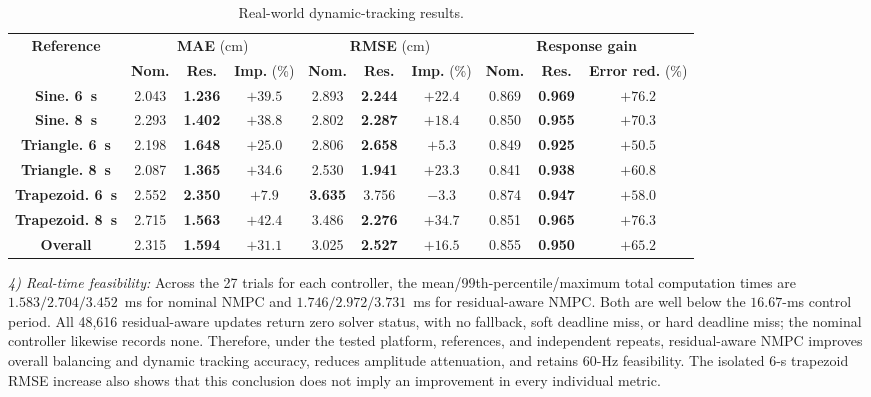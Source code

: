 \documentclass[letterpaper, 10 pt, conference]{ieeeconf}  %
\begin{document}
\begin{table}[t]
    \caption{Real-world dynamic-tracking results.}
    \label{tab:real_world_dynamic_tracking}
    \centering
    {\renewcommand{\arraystretch}{1.2}
    \begin{tabular}{|c|ccc|ccc|ccc|}
        \hline
        \multirow{2}{*}{\textbf{Reference}} &
        \multicolumn{3}{c|}{\textbf{MAE} (cm)} &
        \multicolumn{3}{c|}{\textbf{RMSE} (cm)} &
        \multicolumn{3}{c|}{\textbf{Response gain}} \\
        \cline{2-10}
        & \textbf{Nom.} & \textbf{Res.} & \textbf{Imp.} (\%)
        & \textbf{Nom.} & \textbf{Res.} & \textbf{Imp.} (\%)
        & \textbf{Nom.} & \textbf{Res.} & \textbf{Error red.} (\%) \\
        \hline
        \textbf{Sine. 6~s} & 2.043 & \textbf{1.236} & \textbf{$+39.5$}
        & 2.893 & \textbf{2.244} & \textbf{$+22.4$}
        & 0.869 & \textbf{0.969} & \textbf{$+76.2$} \\
        \textbf{Sine. 8~s} & 2.293 & \textbf{1.402} & \textbf{$+38.8$}
        & 2.802 & \textbf{2.287} & \textbf{$+18.4$}
        & 0.850 & \textbf{0.955} & \textbf{$+70.3$} \\
        \textbf{Triangle. 6~s} & 2.198 & \textbf{1.648} & \textbf{$+25.0$}
        & 2.806 & \textbf{2.658} & \textbf{$+5.3$}
        & 0.849 & \textbf{0.925} & \textbf{$+50.5$} \\
        \textbf{Triangle. 8~s} & 2.087 & \textbf{1.365} & \textbf{$+34.6$}
        & 2.530 & \textbf{1.941} & \textbf{$+23.3$}
        & 0.841 & \textbf{0.938} & \textbf{$+60.8$} \\
        \textbf{Trapezoid. 6~s} & 2.552 & \textbf{2.350} & \textbf{$+7.9$}
        & \textbf{3.635} & 3.756 & $-3.3$
        & 0.874 & \textbf{0.947} & \textbf{$+58.0$} \\
        \textbf{Trapezoid. 8~s} & 2.715 & \textbf{1.563} & \textbf{$+42.4$}
        & 3.486 & \textbf{2.276} & \textbf{$+34.7$}
        & 0.851 & \textbf{0.965} & \textbf{$+76.3$} \\
        \hline
        \textbf{Overall} & 2.315 & \textbf{1.594} & \textbf{$+31.1$}
        & 3.025 & \textbf{2.527} & \textbf{$+16.5$}
        & 0.855 & \textbf{0.950} & \textbf{$+65.2$} \\
        \hline
    \end{tabular}}
\end{table}

\textit{4) Real-time feasibility:}
Across the 27 trials for each controller, the mean/99th-percentile/maximum total computation times are
$1.583/2.704/3.452$~ms for nominal NMPC and $1.746/2.972/3.731$~ms for residual-aware NMPC. Both are well below
the $16.67$-ms control period. All 48,616 residual-aware updates return zero solver status, with no fallback,
soft deadline miss, or hard deadline miss; the nominal controller likewise records none. Therefore, under the
tested platform, references, and independent repeats, residual-aware NMPC improves overall balancing and dynamic
tracking accuracy, reduces amplitude attenuation, and retains 60-Hz feasibility. The isolated 6-s trapezoid RMSE
increase also shows that this conclusion does not imply an improvement in every individual metric.
\end{document}
